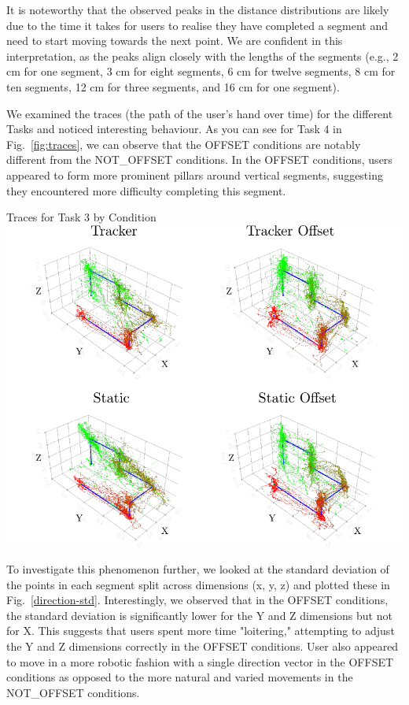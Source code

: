 It is noteworthy that the observed peaks in the distance distributions are likely due to the time it takes for users to realise they have completed a segment and need to start moving towards the next point. We are confident in this interpretation, as the peaks align closely with the lengths of the segments (e.g., 2 cm for one segment, 3 cm for eight segments, 6 cm for twelve segments, 8 cm for ten segments, 12 cm for three segments, and 16 cm for one segment).

We examined the traces (the path of the user's hand over time) for the different Tasks and noticed interesting behaviour. As you can see for Task 4 in Fig.~\ref{fig:traces}, we can observe that the OFFSET conditions are notably different from the NOT\_OFFSET conditions. In the OFFSET conditions, users appeared to form more prominent pillars around vertical segments, suggesting they encountered more difficulty completing this segment.

\begin{figureBox}[label={fig:traces}, width=0.8\linewidth]{Traces for Task 3 by Condition}
    \includegraphics[width=1.0\linewidth]{./evaluation/figures/task_3.pdf}
\end{figureBox}

To investigate this phenomenon further, we looked at the standard deviation of the points in each segment split across dimensions (x, y, z) and plotted these in Fig.~\ref{direction-std}. Interestingly, we observed that in the OFFSET conditions, the standard deviation is significantly lower for the Y and Z dimensions but not for X. This suggests that users spent more time "loitering," attempting to adjust the Y and Z dimensions correctly in the OFFSET conditions. User also appeared to move in a more robotic fashion with a single direction vector in the OFFSET conditions as opposed to the more natural and varied movements in the NOT\_OFFSET conditions.

